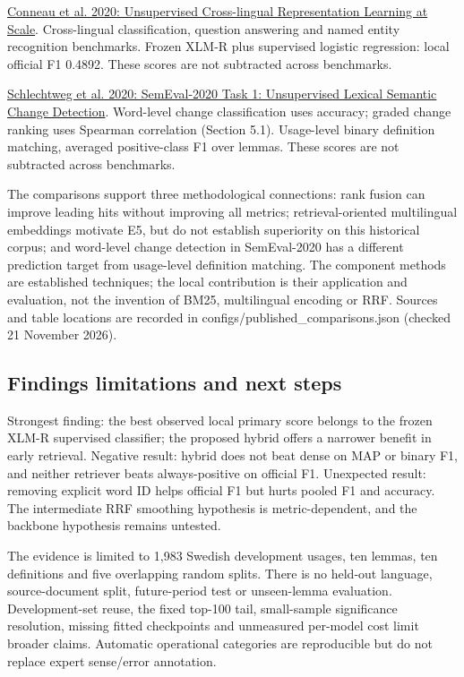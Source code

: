 \href{https://aclanthology.org/2020.acl-main.747/}{Conneau et al. 2020: Unsupervised Cross-lingual Representation Learning at Scale}. Cross-lingual classification, question answering and named entity recognition benchmarks. Frozen XLM-R plus supervised logistic regression: local official F1 0.4892. These scores are not subtracted across benchmarks.

\href{https://aclanthology.org/2020.semeval-1.1/}{Schlechtweg et al. 2020: SemEval-2020 Task 1: Unsupervised Lexical Semantic Change Detection}. Word-level change classification uses accuracy; graded change ranking uses Spearman correlation (Section 5.1). Usage-level binary definition matching, averaged positive-class F1 over lemmas. These scores are not subtracted across benchmarks.

The comparisons support three methodological connections: rank fusion can improve leading hits without improving all metrics; retrieval-oriented multilingual embeddings motivate E5, but do not establish superiority on this historical corpus; and word-level change detection in SemEval-2020 has a different prediction target from usage-level definition matching. The component methods are established techniques; the local contribution is their application and evaluation, not the invention of BM25, multilingual encoding or RRF. Sources and table locations are recorded in configs/published\_comparisons.json (checked 21 November 2026).

\subsection{Findings limitations and next steps}
Strongest finding: the best observed local primary score belongs to the frozen XLM-R supervised classifier; the proposed hybrid offers a narrower benefit in early retrieval. Negative result: hybrid does not beat dense on MAP or binary F1, and neither retriever beats always-positive on official F1. Unexpected result: removing explicit word ID helps official F1 but hurts pooled F1 and accuracy. The intermediate RRF smoothing hypothesis is metric-dependent, and the backbone hypothesis remains untested.

The evidence is limited to 1,983 Swedish development usages, ten lemmas, ten definitions and five overlapping random splits. There is no held-out language, source-document split, future-period test or unseen-lemma evaluation. Development-set reuse, the fixed top-100 tail, small-sample significance resolution, missing fitted checkpoints and unmeasured per-model cost limit broader claims. Automatic operational categories are reproducible but do not replace expert sense/error annotation.

